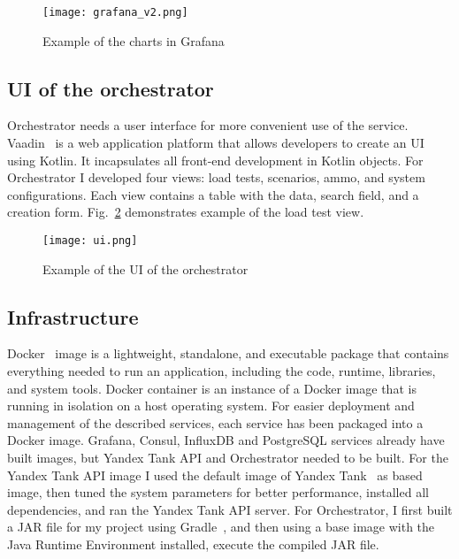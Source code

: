 \begin{figure}[t]
    \centering
    \texttt{[image: grafana\_v2.png]}
    \caption{Example of the charts in Grafana}
    \label{fig:grafana}
\end{figure}

\subsection{UI of the orchestrator}\label{subsec:ui-of-the-orchestrator}
Orchestrator needs a user interface for more convenient use of the service. Vaadin~\cite{vaadin} is a web application platform that allows developers to create an UI using Kotlin. It incapsulates all front-end development in Kotlin objects. For Orchestrator I developed four views: load tests, scenarios, ammo, and system configurations. Each view contains a table with the data, search field, and a creation form. Fig.~\ref{fig:ui} demonstrates example of the load test view.

\begin{figure}[t]
    \centering
    \texttt{[image: ui.png]}
    \caption{Example of the UI of the orchestrator}
    \label{fig:ui}
\end{figure}

\subsection{Infrastructure}\label{subsec:infrastructure}
Docker~\cite{docker_start} image is a lightweight, standalone, and executable package that contains everything needed to run an application, including the code, runtime, libraries, and system tools. Docker container is an instance of a Docker image that is running in isolation on a host operating system.
For easier deployment and management of the described services, each service has been packaged into a Docker image. Grafana, Consul, InfluxDB and PostgreSQL services already have built images, but Yandex Tank API and Orchestrator needed to be built. For the Yandex Tank API image I used the default image of Yandex Tank~\cite{yandex_tank_image} as based image, then tuned the system parameters for better performance, installed all dependencies, and ran the Yandex Tank API server. For Orchestrator, I first built a JAR file for my project using Gradle~\cite{gradle}, and then using a base image with the Java Runtime Environment installed, execute the compiled JAR file.

